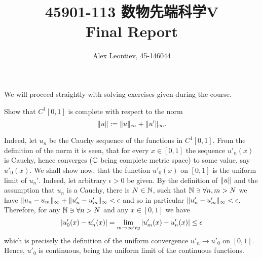 \documentclass[10pt]{article} %
\title{45901-113 数物先端科学V\\Final Report}
\author{Alex Leontiev, 45-146044}
\begin{document}
\begin{CJK}{UTF8}{bsmi}
\maketitle
\end{CJK}
We will proceed straightly with solving exercises given during the course.
\begin{myprob}[Oct 8]Show that $C^1[0,1]$ is complete with respect to the norm
\[\|u\|:=\|u\|_\infty+\|u'\|_\infty.\]
\end{myprob}
Indeed, let $u_n$ be the Cauchy sequence of the functions in $C^1[0,1]$. From the definition
of the norm it is seen, that for every $x\in[0,1]$ the sequence $u'_n(x)$ is Cauchy, hence converges
($\mathbb{C}$ being complete metric space) to some value, say $u'_0(x)$. We shall show now, that the function $u'_0(x)$ on $[0,1]$ is
the uniform limit of $u_n'$. Indeed, let arbitrary $\epsilon>0$ be given. By the definition of $\|u\|$ and the assumption
that $u_n$ is a Cauchy, there is $N\in\mathbb{N}$, such that $ \mathbb{N}\ni\forall n,m>N$ we have
$\|u_n-u_m\|_\infty+\|u'_n-u'_m\|_\infty<\epsilon$ and so in particular
$\|u'_n-u'_m\|_\infty<\epsilon$. Therefore, for any $\mathbb{N}\ni\forall n>N$ and any $x\in[0,1]$ we have
\[\myabs{u_0'(x)-u'_n(x)}=\lim_{m\to\infty'ty}\myabs{u'_m(x)-u'_n(x)}\leq\epsilon\]
which is precisely the definition of the uniform convergence $u'_n\to u'_0$ on $[0,1]$. Hence, $u'_0$ is continuous, being
the uniform limit of the continuous functions.
\end{document}
